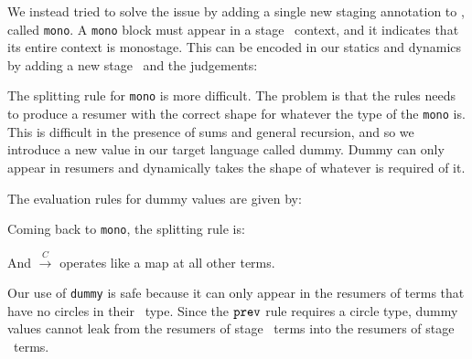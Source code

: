 We instead tried to solve the issue by adding a single new staging annotation to \lang, called \texttt{mono}.  
A \texttt{mono} block must appear in a stage \bbone\ context, and it indicates that its entire context is monostage.
This can be encoded in our statics and dynamics by adding a new stage \bbmono\ and the judgements:

The splitting rule for \texttt{mono} is more difficult.
The problem is that the rules needs to produce a resumer with the correct shape
for whatever the type of the \texttt{mono} is.
This is difficult in the presence of sums and general recursion,
and so we introduce a new value in our target language called dummy.
Dummy can only appear in resumers and dynamically takes the shape of whatever is required of it.

The evaluation rules for dummy values are given by:

Coming back to \texttt{mono}, the splitting rule is:
And $\overset{C}{\rightarrow}$ operates like a map at all other terms.

Our use of {\tt dummy} is safe because
it can only appear in the resumers of terms that have no circles in their \lang\ type.
Since the ${\tt prev}$ rule requires a circle type, dummy values cannot leak from
the resumers of stage \bbone\ terms into the resumers of stage \bbtwo\ terms.



